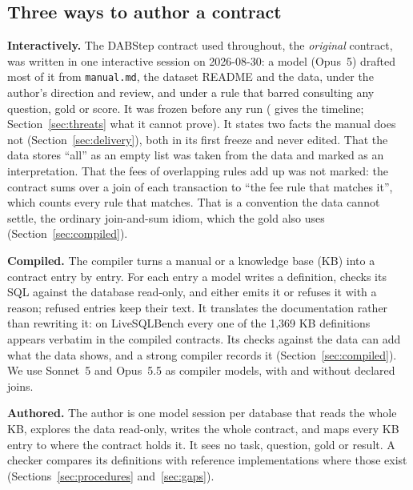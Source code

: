 \subsection{Three ways to author a contract}
\label{sec:authoring-paths}

\textbf{Interactively.} The DABStep contract used throughout, the
\emph{original} contract, was written in one interactive session on
2026-08-30: a model (Opus~5) drafted most of it from \texttt{manual.md},
the dataset README and the data, under the author's direction and review,
and under a rule that barred consulting any question, gold or score. It
was frozen before any run ( gives the timeline;
Section~\ref{sec:threats} what it cannot prove). It states two facts the
manual does not (Section~\ref{sec:delivery}), both in its first freeze and
never edited. That the data stores ``all'' as an empty list was taken from
the data and marked as an interpretation. That the fees of overlapping
rules add up was not marked: the contract sums over a join of each
transaction to ``the fee rule that matches it'', which counts every rule
that matches. That is a convention the data cannot settle, the ordinary join-and-sum
idiom, which the gold also uses (Section~\ref{sec:compiled}).

\textbf{Compiled.} The compiler turns a manual or a knowledge base (KB)
into a contract entry by entry. For each entry a model writes a definition,
checks its SQL against the database read-only, and either emits it or
refuses it with a reason; refused entries keep their text. It translates
the documentation rather than rewriting it: on LiveSQLBench every one of
the 1{,}369 KB definitions appears verbatim in the compiled contracts. Its
checks against the data can add what the data shows, and a strong compiler
records it (Section~\ref{sec:compiled}). We use Sonnet~5 and
Opus~5.5 as compiler models, with and without declared joins.

\textbf{Authored.} The author is one model session
per database that reads the whole KB, explores the data read-only, writes
the whole contract, and maps every KB entry to where the contract holds
it. It sees no task, question, gold or result. A checker compares its
definitions with reference implementations where those exist
(Sections~\ref{sec:procedures} and~\ref{sec:gaps}).
